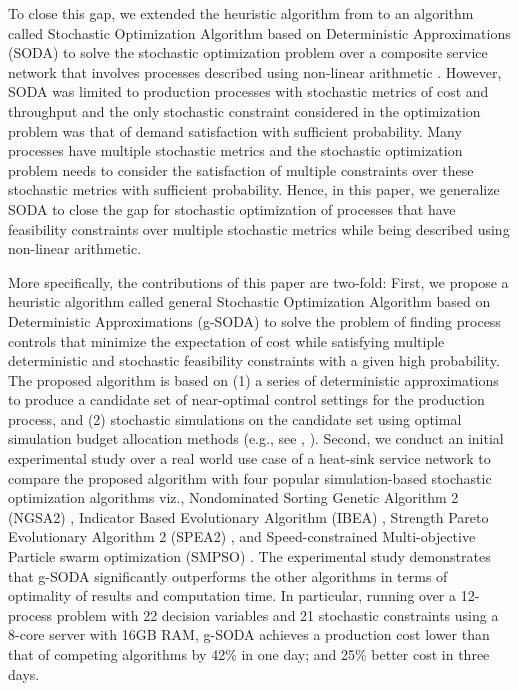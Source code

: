 \documentclass[a4paper, 12pt]{article} %
\begin{document}
To close this gap, we extended the heuristic algorithm from \cite{Krishnamoorthy2015} to an algorithm called Stochastic Optimization Algorithm based on Deterministic Approximations (SODA) to solve the stochastic optimization problem over a composite service network that involves processes described using non-linear arithmetic \cite{GMU-CS-TR-2017-3}.
However, SODA was limited to production processes with stochastic metrics of cost and throughput and the only stochastic constraint considered in the optimization problem was that of demand satisfaction with sufficient probability. Many processes have multiple stochastic metrics and the stochastic optimization problem needs to consider the satisfaction of multiple constraints over these stochastic metrics with sufficient probability. 
Hence, in this paper, we generalize SODA to close the gap for stochastic optimization of processes that have feasibility constraints over multiple stochastic metrics while being described using non-linear arithmetic.

More specifically, the contributions of this paper are two-fold:
First, we propose a heuristic algorithm called general Stochastic Optimization Algorithm based on Deterministic Approximations (g-SODA) to solve the problem of finding process controls that minimize the expectation of cost while satisfying multiple deterministic and stochastic feasibility constraints with a given high probability. 
The proposed algorithm is based on (1) a series of deterministic approximations to produce a candidate set of near-optimal control settings for the production process, and (2) stochastic simulations on the candidate set using optimal simulation budget allocation methods (e.g., see \cite{Chen2011}, \cite{Lee2012OCBACO}).  
Second, we conduct an initial experimental study over a real world use case of a heat-sink service network to compare the proposed algorithm with four popular simulation-based stochastic optimization algorithms viz., Nondominated Sorting Genetic Algorithm 2 (NGSA2) \cite{ngsa2}, Indicator Based Evolutionary Algorithm (IBEA) \cite{ibea}, Strength Pareto Evolutionary Algorithm 2 (SPEA2) \cite{spea2}, and Speed-constrained Multi-objective Particle swarm optimization (SMPSO) \cite{NDG09}.
 The experimental study demonstrates that g-SODA significantly outperforms the other algorithms in terms of optimality of results and computation time. In particular, 
running over a 12-process problem with 22 decision variables and 21 stochastic constraints using a 8-core server with 16GB RAM, g-SODA achieves a production cost lower than that of competing algorithms by 42\% in one day; and 25\% better cost in three days.
\end{document}
